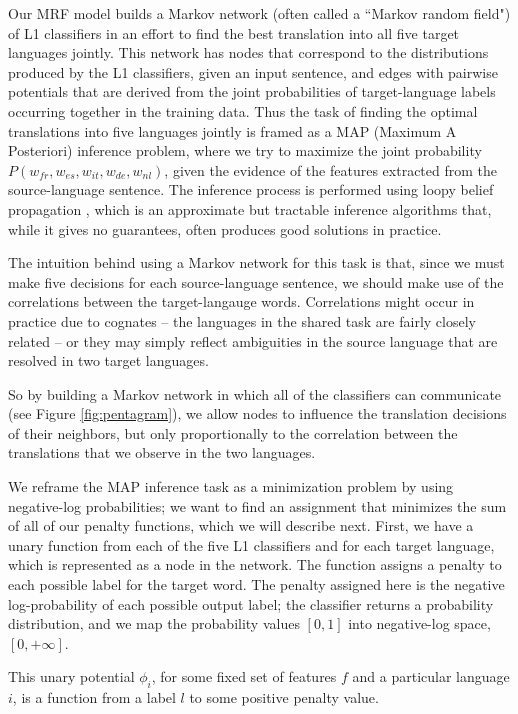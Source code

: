 \documentclass[11pt,letterpaper]{article}
\begin{document}
Our MRF model builds a Markov network (often called a ``Markov random
field") of L1 classifiers in an effort to find the best translation into
all five target languages jointly. This network has nodes that correspond to
the distributions produced by the L1 classifiers, given an input
sentence, and edges with pairwise potentials that are derived from the joint
probabilities of target-language labels occurring together in the training
data. 
Thus the task of finding the optimal translations into five languages jointly
is framed as a MAP (Maximum A Posteriori) inference problem, where we try to
maximize the joint probability $P(w_{fr},w_{es},w_{it},w_{de},w_{nl})$, given
the evidence of the features extracted from the source-language sentence. The
inference process is performed using loopy belief propagation
\cite{DBLP:conf/uai/MurphyWJ99}, which is an approximate but tractable
inference algorithms that, while it gives no guarantees, often produces good
solutions in practice.

The intuition behind using a Markov network for this task is that, since we
must make five decisions for each source-language sentence, we should make use
of the correlations between the target-langauge words. Correlations might occur
in practice due to cognates -- the languages in the shared task are fairly
closely related -- or they may simply reflect ambiguities in the source
language that are resolved in two target languages.

So by building a Markov network in which all of the classifiers can
communicate (see Figure \ref{fig:pentagram}), we allow nodes to influence the
translation decisions of their neighbors, but only proportionally to the
correlation between the translations that we observe in the two languages.

We reframe the MAP inference task as a minimization problem by using
negative-log probabilities; we want to find an assignment that minimizes the
sum of all of our penalty functions, which we will describe next.
First, we have a unary function from each of the five L1 classifiers and for
each target language, which is represented as a node in the network. The
function assigns a penalty to each possible label for the target word. The
penalty assigned here is the negative log-probability of each possible output
label; the classifier returns a probability distribution, and we map the
probability values $[0,1]$ into negative-log space, $[0, +\infty]$.

This unary potential $\phi_i$, for some fixed set of features $f$ and a
particular language $i$, is a function from a label $l$ to some positive
penalty value.
\end{document}
